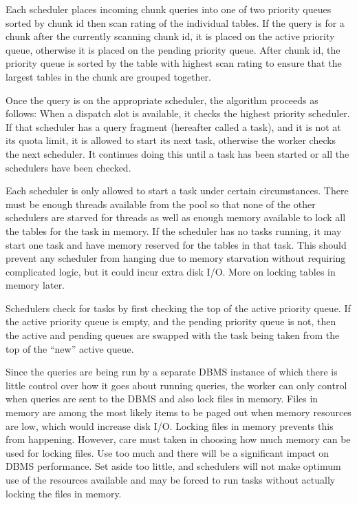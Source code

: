 \documentclass[DM,lsstdraft,toc]{lsstdoc}
\begin{document}
Each scheduler places incoming chunk queries into one of two priority
queues sorted by chunk id then scan rating of the individual tables. If
the query is for a chunk after the currently scanning chunk id, it is
placed on the active priority queue, otherwise it is placed on the
pending priority queue. After chunk id, the priority queue is sorted by
the table with highest scan rating to ensure that the largest tables in
the chunk are grouped together.

Once the query is on the appropriate scheduler, the algorithm proceeds
as follows: When a dispatch slot is available, it checks the highest
priority scheduler. If that scheduler has a query fragment (hereafter
called a task), and it is not at its quota limit, it is allowed to start
its next task, otherwise the worker checks the next scheduler. It
continues doing this until a task has been started or all the schedulers
have been checked.

Each scheduler is only allowed to start a task under certain circumstances.
There must be enough threads available from the pool so that none of the other
schedulers are starved for threads as well as enough memory available to lock
all the tables for the task in memory. If the scheduler has no tasks running,
it may start one task and have memory reserved for the tables in that task.
This should prevent any scheduler from hanging due to memory starvation
without requiring complicated logic, but it could incur extra disk I/O. More
on locking tables in memory later.

Schedulers check for tasks by first checking the top of the active
priority queue. If the active priority queue is empty, and the pending
priority queue is not, then the active and pending queues are swapped
with the task being taken from the top of the ``new'' active queue.

Since the queries are being run by a separate DBMS instance of which
there is little control over how it goes about running queries, the worker
can only control when queries are sent to the DBMS and also lock files in
memory. Files in memory are among the most likely items to be paged out
when memory resources are low, which would increase disk I/O. Locking
files in memory prevents this from happening. However, care must taken
in choosing how much memory can be used for locking files. Use too much
and there will be a significant impact on DBMS performance. Set aside
too little, and schedulers will not make optimum use of the resources
available and may be forced to run tasks without actually locking the
files in memory.
\end{document}
